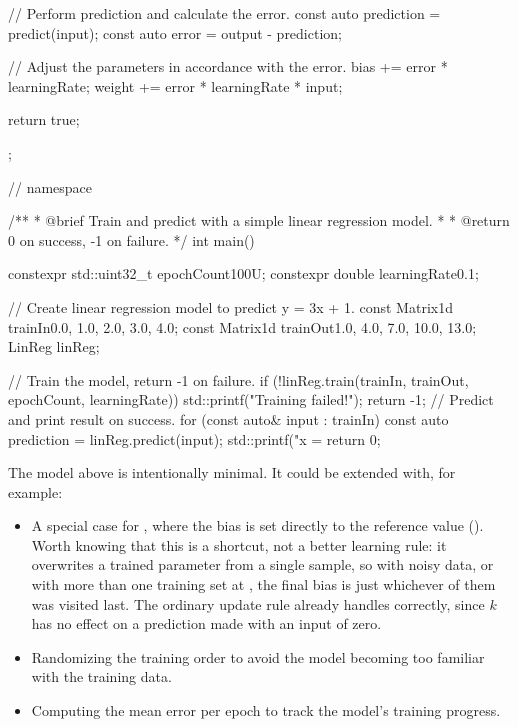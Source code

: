 \begin{cppcode}
{{{{{                // Perform prediction and calculate the error.
                const auto prediction = predict(input);
                const auto error      = output - prediction;

                // Adjust the parameters in accordance with the error.
                bias   += error * learningRate;
                weight += error * learningRate * input;
            }
        }
        return true;
    }
};
} // namespace

/**
 * @brief Train and predict with a simple linear regression model.
 *
 * @return 0 on success, -1 on failure.
 */
int main()
{
    constexpr std::uint32_t epochCount{100U};
    constexpr double learningRate{0.1};

    // Create linear regression model to predict y = 3x + 1.
    const Matrix1d trainIn{0.0, 1.0, 2.0, 3.0, 4.0};
    const Matrix1d trainOut{1.0, 4.0, 7.0, 10.0, 13.0};
    LinReg linReg{};

    // Train the model, return -1 on failure.
    if (!linReg.train(trainIn, trainOut, epochCount, learningRate))
    {
        std::printf("Training failed!\n");
        return -1;
    }
    // Predict and print result on success.
    for (const auto& input : trainIn)
    {
        const auto prediction = linReg.predict(input);
        std::printf("x = %
    }
    return 0;
}
\end{cppcode}

The model above is intentionally minimal. It could be extended with, for example:
\begin{itemize}
  \item A special case for , where the bias is set directly to the reference value
    (). Worth knowing that this is a shortcut, not a better learning rule: it
    overwrites a trained parameter from a single sample, so with noisy data, or with more than one
    training set at , the final bias is just whichever of them was visited last. The
    ordinary update rule already handles  correctly, since $k$ has no effect on a
    prediction made with an input of zero.
  \item Randomizing the training order to avoid the model becoming too familiar with the training
    data.
  \item Computing the mean error per epoch to track the model's training progress.
\end{itemize}
